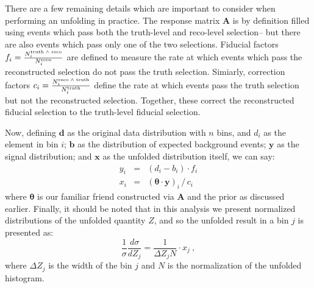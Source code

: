 	There are a few remaining details which are important to consider when performing an unfolding in practice. The response matrix $\mathbf{A}$ is by definition filled using events which pass both the truth-level and reco-level selection-- but there are also events which pass only one of the two selections. Fiducial factors $f_{i} = \frac{N^{\rm truth\;\wedge\;reco}_{i}}{N^{\rm reco}_{i}}$ are defined to measure the rate at which events which pass the reconstructed selection do not pass the truth selection. Simiarly, correction factors $c_{i} = \frac{N^{\rm reco\;\wedge\;truth}_{i}}{N^{\rm truth}_{i}}$ define the rate at which events pass the truth selection but not the reconstructed selection. Together, these correct the reconstructed fiducial selection to the truth-level fiducial selection.

	Now, defining $\mathbf{d}$ as the original data distribution with $n$ bins, and $d_i$ as the element in bin $i$; $\mathbf{b}$ as the distribution of expected background events; $\mathbf{y}$ as the signal distribution; and $\mathbf{x}$ as the unfolded distribution itself, we can say:
%
\begin{equation}
\begin{array} {rcl}
  y_i & = & (d_i - b_i) \cdot f_i \\
    x_i & = & (\boldsymbol{\theta} \cdot \mathbf{y})_i\,/\,c_i
    \end{array}
\end{equation}
%
	where $\mathbf{\theta}$ is our familiar friend constructed via $\mathbf{A}$ and the prior as discussed earlier. Finally, it should be noted that in this analysis we present normalized distributions of the unfolded quantity $Z$, and so the unfolded result in a bin $j$ is presented as:
%
\begin{equation}
  \frac{1}{\sigma} \frac{d\sigma}{dZ_j} = \frac{1}{\Delta Z_j N} \cdot x_j \ ,
\end{equation}
%
where $\Delta Z_j$ is the width of the bin $j$ and $N$ is the normalization of the unfolded histogram.
